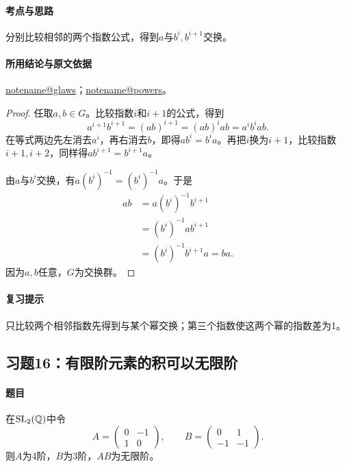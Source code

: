 \documentclass[UTF8,a4paper,11pt,fontset=windows]{ctexart}
\makeatletter
\newcommand{\noteref}[1]{\hyperref[note:#1]{\csname notename@#1\endcsname}}
\newcommand{\exref}[2]{\hyperref[ex:#1:#2]{第#1章习题#2}}
\makeatother
\begin{document}
\paragraph{考点与思路}
分别比较相邻的两个指数公式，得到$a$与$b^i,b^{i+1}$交换。

\paragraph{所用结论与原文依据}
\noteref{glaws}；\noteref{powers}。


\begin{proof}
任取$a,b\in G$。比较指数$i$和$i+1$的公式，得到
\[
a^{i+1}b^{i+1}=(ab)^{i+1}=(ab)^i ab=a^ib^iab.
\]
在等式两边先左消去$a^i$，再右消去$b$，即得$ab^i=b^ia$。再把$i$换为$i+1$，比较指数$i+1,i+2$，同样得$ab^{i+1}=b^{i+1}a$。

由$a$与$b^i$交换，有$a(b^i)^{-1}=(b^i)^{-1}a$。于是
\begin{align*}
ab&=a(b^i)^{-1}b^{i+1}\\
&=(b^i)^{-1}ab^{i+1}\\
&=(b^i)^{-1}b^{i+1}a=ba.
\end{align*}
因为$a,b$任意，$G$为交换群。
\end{proof}

\paragraph{复习提示}
只比较两个相邻指数先得到与某个幂交换；第三个指数使这两个幂的指数差为1。


\subsection{习题16：\texorpdfstring{有限阶元素的积可以无限阶}{有限阶元素的积可以无限阶}}
\label{ex:1:16}

\paragraph{题目}
在$\operatorname{SL}_2(\mathbb Q)$中令
\[
A=\begin{pmatrix}0&-1\\1&0\end{pmatrix},\qquad B=\begin{pmatrix}0&1\\-1&-1\end{pmatrix}.
\]
则$A$为4阶，$B$为3阶，$AB$为无限阶。
\end{document}
